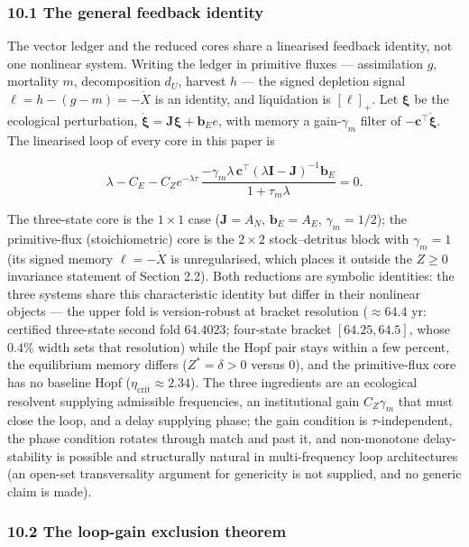 \documentclass[11pt]{article}
\begin{document}
\subsubsection{10.1 The general feedback
identity}\label{the-general-feedback-identity}

The vector ledger and the reduced cores share a linearised feedback
identity, not one nonlinear system. Writing the ledger in primitive
fluxes --- assimilation \(g\), mortality \(m\), decomposition \(d_U\),
harvest \(h\) --- the signed depletion signal
\(\ell = h - (g - m) = -\dot X\) is an identity, and liquidation is
\([\ell]_+\). Let \(\boldsymbol{\xi}\) be the ecological perturbation,
\(\dot{\boldsymbol{\xi}} = \mathbf{J}\boldsymbol{\xi} + \mathbf{b}_E e\),
with memory a gain-\(\gamma_m\) filter of
\(-\mathbf{c}^\top\dot{\boldsymbol{\xi}}\). The linearised loop of every
core in this paper is

\[\lambda - C_E - C_Z e^{-\lambda\tau}\, \frac{-\gamma_m\lambda\,\mathbf{c}^\top(\lambda\mathbf{I} - \mathbf{J})^{-1}\mathbf{b}_E}{1 + \tau_m\lambda} = 0. \tag{14}\]

The three-state core is the \(1\times1\) case (\(\mathbf{J} = A_N\),
\(\mathbf{b}_E = A_E\), \(\gamma_m = 1/2\)); the primitive-flux
(stoichiometric) core is the \(2\times2\) stock--detritus block with
\(\gamma_m = 1\) (its signed memory \(\ell = -\dot X\) is unregularised,
which places it outside the \(Z \ge 0\) invariance statement of Section
2.2). Both reductions are symbolic identities: the three systems share
this characteristic identity but differ in their nonlinear objects ---
the upper fold is version-robust at bracket resolution (\(\approx64.4\)
yr: certified three-state second fold \(64.4023\); four-state bracket
\([64.25, 64.5]\), whose \(0.4\%\) width sets that resolution) while the
Hopf pair stays within a few percent, the equilibrium memory differs
(\(Z^* = \delta > 0\) versus \(0\)), and the primitive-flux core has no
baseline Hopf (\(\eta_{\mathrm{crit}} \approx 2.34\)). The three
ingredients are an ecological resolvent supplying admissible
frequencies, an institutional gain \(C_Z\gamma_m\) that must close the
loop, and a delay supplying phase; the gain condition is
\(\tau\)-independent, the phase condition rotates through match and past
it, and non-monotone delay-stability is possible and structurally
natural in multi-frequency loop architectures (an open-set
transversality argument for genericity is not supplied, and no generic
claim is made).

\subsubsection{10.2 The loop-gain exclusion
theorem}\label{the-loop-gain-exclusion-theorem}
\end{document}
